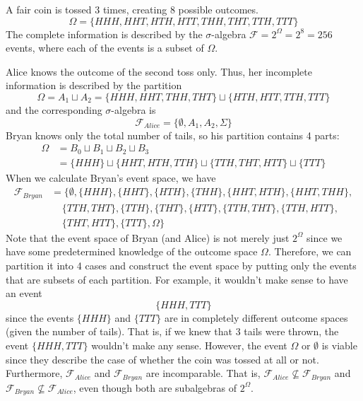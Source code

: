 \documentclass{article}
\begin{document}
      \begin{example}
        A fair coin is tossed 3 times, creating 8 possible outcomes. 
        \begin{equation}
          \Omega = \{HHH, HHT, HTH, HTT, THH, THT, TTH, TTT\}
        \end{equation}
        The complete information is described by the $\sigma$-algebra $\mathcal{F} = 2^{\Omega} = 2^8 = 256$ events, where each of the events is a subset of $\Omega$. 

        Alice knows the outcome of the second toss only. Thus, her incomplete information is described by the partition 
        \begin{equation}
          \Omega = A_1 \sqcup A_2 = \{HHH, HHT, THH, THT\} \sqcup \{HTH, HTT, TTH, TTT\}
        \end{equation}
        and the corresponding $\sigma$-algebra is 
        \begin{equation}
        \mathcal{F}_{Alice} = \{\emptyset, A_1, A_2, \Sigma\}
        \end{equation}
        Bryan knows only the total number of tails, so his partition contains 4 parts: 
        \begin{align*}
          \Omega & = B_0 \sqcup B_1 \sqcup B_2 \sqcup B_3 \\
            & = \{HHH\} \sqcup \{HHT, HTH, TTH\} \sqcup \{TTH, THT, HTT\} \sqcup \{TTT\}
        \end{align*}
        When we calculate Bryan's event space, we have
        \begin{align*}
          \mathcal{F}_{Bryan} & = \big\{\emptyset, \{HHH\}, \{HHT\}, \{HTH\}, \{THH\}, \{HHT, HTH\}, \{HHT, THH\}, \\
          & \;\;\;\;\{TTH, THT\}, \{TTH\}, \{THT\}, \{HTT\}, \{TTH, THT\},\{TTH, HTT\}, \\
          & \;\;\;\;\{THT, HTT\}, \{TTT\}, \Omega \big\} 
        \end{align*}
        Note that the event space of Bryan (and Alice) is not merely just $2^{\Omega}$ since we have some predetermined knowledge of the outcome space $\Omega$. Therefore, we can partition it into 4 cases and construct the event space by putting only the events that are subsets of each partition. For example, it wouldn't make sense to have an event 
        \begin{equation}
          \{HHH, TTT\}
        \end{equation}
        since the events $\{HHH\}$ and $\{TTT\}$ are in completely different outcome spaces (given the number of tails). That is, if we knew that 3 tails were thrown, the event $\{HHH, TTT\}$ wouldn't make any sense. However, the event $\Omega$ or $\emptyset$ is viable since they describe the case of whether the coin was tossed at all or not. 
        Furthermore, $\mathcal{F}_{Alice}$ and $\mathcal{F}_{Bryan}$ are incomparable. That is, $\mathcal{F}_{Alice} \not\subseteq \mathcal{F}_{Bryan}$ and $\mathcal{F}_{Bryan} \not\subseteq \mathcal{F}_{Alice}$, even though both are subalgebras of $2^{\Omega}$. 
      \end{example}
\end{document}
